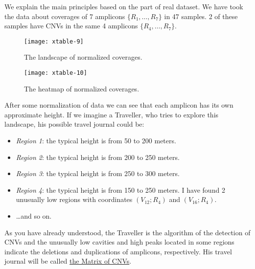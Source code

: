\documentclass{article}
\begin{document}
We explain the main principles based on the part of real dataset. We have took the data about coverages of 7 amplicons $\{ R_1,\ldots ,R_7 \}$ in 47 samples. 2 of these samples have CNVs in the same 4 amplicons $\{ R_4,\ldots ,R_7 \}$.

\begin{figure}[h]
\begin{center}
\begin{minipage}[h]{0.48\linewidth}
\texttt{[image: xtable-9]}
\caption{The landscape of normalized coverages.} 
\label{ris:experimoriginal} 
\end{minipage}
\hfill 
\begin{minipage}[h]{0.48\linewidth}
\texttt{[image: xtable-10]}
\caption{The heatmap of normalized coverages.}
\label{ris:experimcoded}
\end{minipage}
\end{center}
\end{figure}

After some normalization of data we can see that each amplicon has its own approximate height. If we imagine a Traveller, who tries to explore this landscape, his possible travel journal could be:

\begin{itemize}
\item {\it Region 1}: the typical height is from 50 to 200 meters.

\item {\it Region 2}: the typical height is from 200 to 250 meters.

\item {\it Region 3}: the typical height is from 250 to 300 meters.

\item {\it Region 4}: the typical height is from 150 to 250 meters. I have found 2 unusually low regions with coordinates $(V_{12}; R_4)$ and $(V_{16}; R_4)$.

\item \ldots and so on.

\end{itemize}

As you have already understood, the Traveller is the algorithm of the detection of CNVs and the unusually low cavities and high peaks located in some regions indicate the deletions and duplications of amplicons, respectively. His travel journal will be called \hyperlink{fileWithCNVs}{the Matrix of CNVs}.
\end{document}
